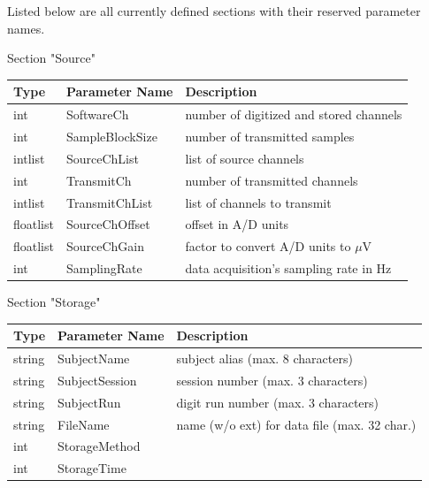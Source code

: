 \documentclass[letterpaper,oneside,12pt]{book}
\begin{document}
\begin{flushleft}
\raggedright Listed below are all currently defined sections with their reserved parameter 
names.
\\[2ex]
\raggedright \large Section "Source" \normalsize
\\[2ex]
 \begin{tabular}{|l|l|l|}
  \hline
  \textbf{Type} & \textbf{Parameter Name} & \textbf{Description}\\
  \hline
  int & SoftwareCh & number of digitized and stored channels \\
  \hline
  int & SampleBlockSize & number of transmitted samples \\
  \hline
  intlist & SourceChList & list of source channels \\
  \hline
  int & TransmitCh & number of transmitted channels \\
  \hline
  intlist & TransmitChList & list of channels to transmit \\
  \hline
  floatlist & SourceChOffset & offset in A/D units\\
  \hline
  floatlist & SourceChGain & factor to convert A/D units to $\mu$V \\
  \hline
  int & SamplingRate & data acquisition's sampling rate in Hz \\
  \hline
 \end{tabular}

\vspace{.5cm}
\raggedright \large Section "Storage" \normalsize
\\[2ex]
 \begin{tabular}{|l|l|l|}
  \hline
  \textbf{Type} & \textbf{Parameter Name} & \textbf{Description}\\
  \hline
  string & SubjectName & subject alias (max. 8 characters) \\
  \hline
  string & SubjectSession & session number (max. 3 characters) \\
  \hline
  string & SubjectRun & digit run number (max. 3 characters) \\
  \hline
  string & FileName & name (w/o ext) for data file (max. 32 char.)\\
  \hline
  int & StorageMethod & \\
  \hline
  int & StorageTime & \\
  \hline
 \end{tabular}


\end{flushleft}
\end{document}
